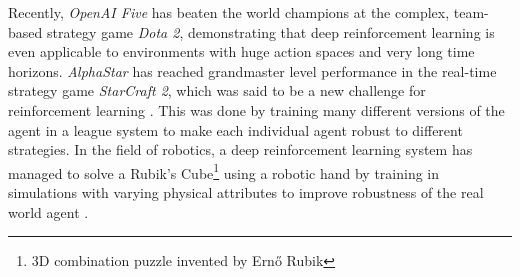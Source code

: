 Recently, \textit{OpenAI Five} \cite{openai-five} has beaten the world champions at the complex, team-based strategy game \textit{Dota 2}, demonstrating that deep reinforcement learning is even applicable to environments with huge action spaces and very long time horizons. \textit{AlphaStar} \cite{alphastar} has reached grandmaster level performance in the real-time strategy game \textit{StarCraft 2}, which was said to be a new challenge for reinforcement learning \cite{sc2ai}. This was done by training many different versions of the agent in a league system to make each individual agent robust to different strategies. In the field of robotics, a deep reinforcement learning system has managed to solve a Rubik's Cube\footnote{3D combination puzzle invented by Ernő Rubik} using a robotic hand by training in simulations with varying physical attributes to improve robustness of the real world agent \cite{rubiks-cube}.